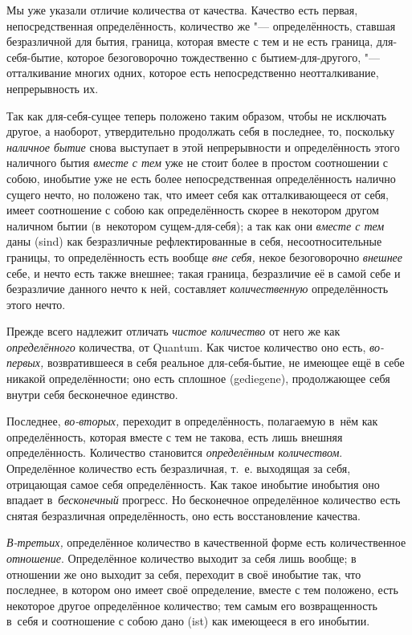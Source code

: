 Мы уже указали отличие количества от качества. Качество есть первая,
непосредственная определённость, количество же "--- определённость, ставшая
безразличной для бытия, граница, которая вместе с тем и не есть граница,
для-себя-бытие, которое безоговорочно тождественно с бытием-для-другого,
"--- отталкивание многих одних, которое есть непосредственно
неотталкивание, непрерывность их.

Так как для-себя-сущее теперь положено таким образом, чтобы не исключать
другое, а наоборот, утвердительно продолжать себя в последнее, то, поскольку
{\em наличное бытие} снова выступает в этой непрерывности и определённость
этого наличного бытия {\em вместе с тем} уже не стоит более в простом
соотношении с собою, инобытие уже не есть более непосредственная определённость
налично сущего нечто, но положено так, что имеет себя как отталкивающееся от
себя, имеет соотношение с собою как определённость скорее в некотором другом
наличном бытии (в~некотором сущем-для-себя); а так как они {\em вместе с тем}
даны (sind) как безразличные рефлектированные в себя, несоотносительные
границы, то определённость есть вообще {\em вне себя,} некое безоговорочно
{\em внешнее} себе, и нечто есть также внешнее; такая граница, безразличие её
в самой себе и безразличие данного нечто к ней, составляет {\em количественную}
определённость этого нечто.

Прежде всего надлежит отличать {\em чистое количество} от него же как
{\em определённого} количества, от Quantum. Как чистое количество оно есть,
{\em во-первых,} возвратившееся в себя реальное для-себя-бытие, не имеющее ещё
в себе никакой определённости; оно есть сплошное (gediegene), продолжающее себя
внутри себя бесконечное единство.

Последнее, {\em во-вторых,} переходит в определённость, полагаемую в~нём как
определённость, которая вместе с тем не такова, есть лишь внешняя
определённость. Количество становится {\em определённым количеством}.
Определённое количество есть безразличная, т.~е. выходящая за себя, отрицающая
самое себя определённость. Как такое инобытие инобытия оно впадает
в~{\em бесконечный} прогресс. Но бесконечное определённое количество есть
снятая безразличная определённость, оно есть восстановление качества.

{\em В-третьих,} определённое количество в качественной форме есть
количественное {\em отношение}. Определённое количество выходит за себя лишь
вообще; в отношении же оно выходит за себя, переходит в своё инобытие так, что
последнее, в котором оно имеет своё определение, вместе с тем положено, есть
некоторое другое определённое количество; тем самым его возвращенность в~себя
и соотношение с собою дано (ist) как имеющееся в его инобытии.

